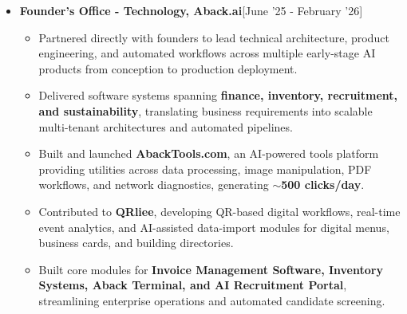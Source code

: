 \documentclass[a4paper,10pt]{article}
\newcommand{\isep}{-2 pt}
\begin{document}
\begin{itemize}
\begin{itemize}
        \item Implemented cloud deployment and infrastructure workflows using \textbf{GCP Cloud Run, Cloud Build, Cloud SQL, Vertex AI, Docker, and GCP IAM}; integrated token metering and billing workflows using Rust/Axum and PostgreSQL.

    \end{itemize}


    \item \textbf{Founder's Office - Technology, Aback.ai}\hfill [June '25 - February '26]
    \\[-0.6cm]

    \begin{itemize}\itemsep \isep

        \item Partnered directly with founders to lead technical architecture, product engineering, and automated workflows across multiple early-stage AI products from conception to production deployment.

        \item Delivered software systems spanning \textbf{finance, inventory, recruitment, and sustainability}, translating business requirements into scalable multi-tenant architectures and automated pipelines.

        \item Built and launched \textbf{AbackTools.com}, an AI-powered tools platform providing utilities across data processing, image manipulation, PDF workflows, and network diagnostics, generating $\sim$\textbf{500 clicks/day}.

        \item Contributed to \textbf{QRliee}, developing QR-based digital workflows, real-time event analytics, and AI-assisted data-import modules for digital menus, business cards, and building directories.

        \item Built core modules for \textbf{Invoice Management Software, Inventory Systems, Aback Terminal, and AI Recruitment Portal}, streamlining enterprise operations and automated candidate screening.

    \end{itemize}
    



\end{itemize}
\end{document}
